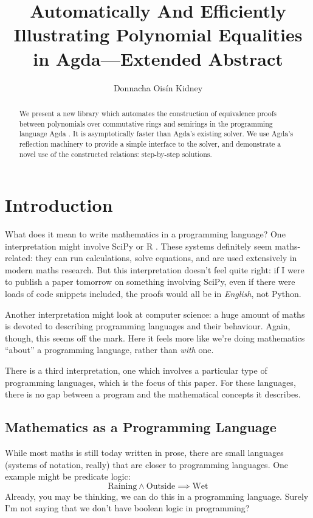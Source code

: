 \documentclass[acmsmall, screen, nonacm, timestamp, review]{acmart}
\author{Donnacha Ois\'in Kidney}
\title{Automatically And Efficiently Illustrating Polynomial Equalities in
  Agda---Extended Abstract}
\theoremstyle{definition}
\theoremstyle{definition}
\begin{document}
\begin{abstract}
  We present a new library which automates the construction of equivalence
  proofs between polynomials over commutative rings and semirings in the
  programming language Agda \cite{norell_dependently_2008}. It is asymptotically
  faster than Agda's existing solver. We use Agda's reflection machinery to
  provide a simple interface to the solver, and demonstrate a novel use of the
  constructed relations: step-by-step solutions.

\end{abstract}
\maketitle

\section{Introduction}
What does it mean to write mathematics in a programming language? One
interpretation might involve SciPy \cite{jones_scipy_2001} or R
\cite{r_core_team_r_2013}. These systems definitely seem maths-related: they can
run calculations, solve equations, and are used extensively in modern maths
research. But this interpretation doesn't feel quite right: if I were to publish
a paper tomorrow on something involving SciPy, even if there were loads of code
snippets included, the proofs would all be in \emph{English}, not Python. 


Another interpretation might look at computer science: a huge amount of maths is
devoted to describing programming languages and their behaviour. Again, though,
this seems off the mark. Here it feels more like we're doing mathematics
``about'' a programming language, rather than \emph{with} one.

There is a third interpretation, one which involves a particular type of
programming languages, which is the focus of this paper. For these languages,
there is no gap between a program and the mathematical concepts it describes.
\subsection{Mathematics as a Programming Language}
While most maths is still today written in prose, there are small\footnotemark
languages (systems of notation, really) that are closer to programming
languages. One example might be predicate logic:
\[ \text{Raining} \wedge \text{Outside} \implies \text{Wet} \]
Already, you may be thinking, we can do this in a programming language. Surely
I'm not saying that we don't have boolean logic in programming?
\end{document}
